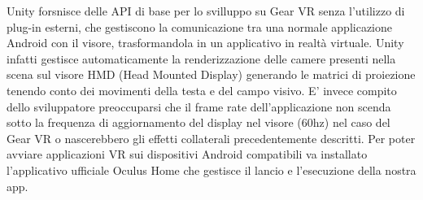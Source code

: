 Unity forsnisce delle API di base per lo svilluppo su Gear VR senza l'utilizzo di plug-in esterni, che gestiscono la comunicazione tra una normale applicazione Android con il visore, trasformandola in un applicativo in realtà virtuale. Unity infatti gestisce automaticamente la renderizzazione delle camere presenti nella scena sul visore HMD (Head Mounted Display) generando le matrici di proiezione tenendo conto dei movimenti della testa e del campo visivo. E' invece compito dello sviluppatore preoccuparsi che il frame rate dell'applicazione non scenda sotto la frequenza di aggiornamento del display nel visore (60hz) nel caso del Gear VR o nascerebbero gli effetti collaterali precedentemente descritti. 
Per poter avviare applicazioni VR sui dispositivi Android compatibili va installato l'applicativo ufficiale Oculus Home che gestisce il lancio e l'esecuzione della nostra app.

 

 




